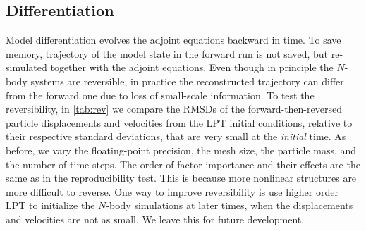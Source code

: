 \documentclass[modern, trackchanges, dvipsnames]{aastex631}
\begin{document}
\vspace{1em}
\subsection{Differentiation}

Model differentiation evolves the adjoint equations backward in time.
To save memory, trajectory of the model state in the forward run is not
saved, but re-simulated together with the adjoint equations.
Even though in principle the $N$-body systems are reversible, in
practice the reconstructed trajectory can differ from the forward one
due to loss of small-scale information.
To test the reversibility, in \autoref{tab:rev} we compare the RMSDs of
the forward-then-reversed particle displacements and velocities from the
LPT initial conditions, relative to their respective standard
deviations, that are very small at the \emph{initial} time.
As before, we vary the floating-point precision, the mesh size, the
particle mass, and the number of time steps.
The order of factor importance and their effects are the same as in the
reproducibility test.
This is because more nonlinear structures are more difficult to reverse.
One way to improve reversibility is use higher order LPT to initialize
the $N$-body simulations at later times, when the displacements and
velocities are not as small.
We leave this for future development.
\end{document}
